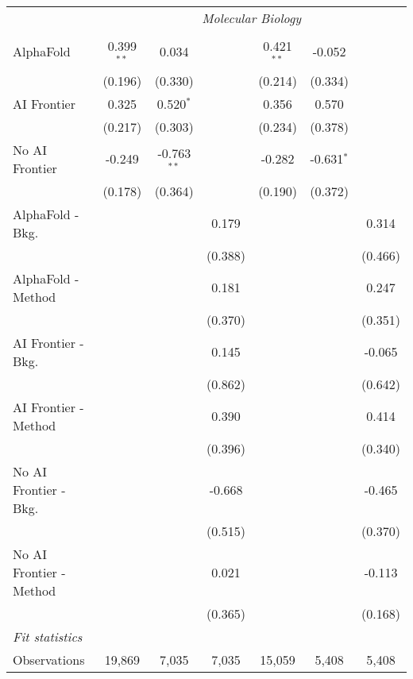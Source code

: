 \begin{tabular}{lcccccc}
 & \multicolumn{6}{c}{\textit{Molecular Biology}} \\ \\
   AlphaFold               & 0.399$^{**}$ & 0.034         &         & 0.421$^{**}$ & -0.052       &   \\   
                           & (0.196)      & (0.330)       &         & (0.214)      & (0.334)      &   \\   
   AI Frontier             & 0.325        & 0.520$^{*}$   &         & 0.356        & 0.570        &   \\   
                           & (0.217)      & (0.303)       &         & (0.234)      & (0.378)      &   \\   
   No AI Frontier          & -0.249       & -0.763$^{**}$ &         & -0.282       & -0.631$^{*}$ &   \\   
                           & (0.178)      & (0.364)       &         & (0.190)      & (0.372)      &   \\   
   AlphaFold - Bkg.        &              &               & 0.179   &              &              & 0.314\\   
                           &              &               & (0.388) &              &              & (0.466)\\   
   AlphaFold - Method      &              &               & 0.181   &              &              & 0.247\\   
                           &              &               & (0.370) &              &              & (0.351)\\   
   AI Frontier - Bkg.      &              &               & 0.145   &              &              & -0.065\\   
                           &              &               & (0.862) &              &              & (0.642)\\   
   AI Frontier - Method    &              &               & 0.390   &              &              & 0.414\\   
                           &              &               & (0.396) &              &              & (0.340)\\   
   No AI Frontier - Bkg.   &              &               & -0.668  &              &              & -0.465\\   
                           &              &               & (0.515) &              &              & (0.370)\\   
   No AI Frontier - Method &              &               & 0.021   &              &              & -0.113\\   
                           &              &               & (0.365) &              &              & (0.168)\\   
   \midrule
   \emph{Fit statistics}\\
   Observations            & 19,869       & 7,035         & 7,035   & 15,059       & 5,408        & 5,408\\  
   

\end{tabular}
